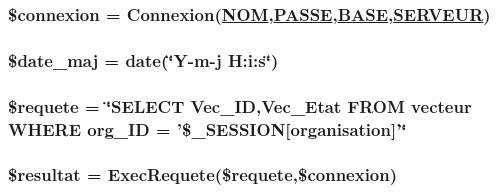 \hypertarget{apa__maj_8php_a0}{
\subsubsection[\$connexion]{\setlength{\rightskip}{0pt plus 5cm}\$connexion = Connexion(\hyperlink{pma__connect_8php_a0}{NOM},\hyperlink{pma__connect_8php_a1}{PASSE},\hyperlink{pma__connect_8php_a3}{BASE},\hyperlink{pma__connect_8php_a2}{SERVEUR})}}
\label{apa__maj_8php_a0}


\hypertarget{apa__maj_8php_a4}{
\subsubsection[\$date\_\-maj]{\setlength{\rightskip}{0pt plus 5cm}\$date\_\-maj = date(\char`\"{}Y-m-j H:i:s\char`\"{})}}
\label{apa__maj_8php_a4}


\hypertarget{apa__maj_8php_a2}{
\subsubsection[\$requete]{\setlength{\rightskip}{0pt plus 5cm}\$requete = \char`\"{}SELECT Vec\_\-ID,Vec\_\-Etat FROM vecteur WHERE org\_\-ID = '\$\_\-SESSION\mbox{[}organisation\mbox{]}'\char`\"{}}}
\label{apa__maj_8php_a2}


\hypertarget{apa__maj_8php_a3}{
\subsubsection[\$resultat]{\setlength{\rightskip}{0pt plus 5cm}\$resultat = Exec\-Requete(\$requete,\$connexion)}}
\label{apa__maj_8php_a3}


